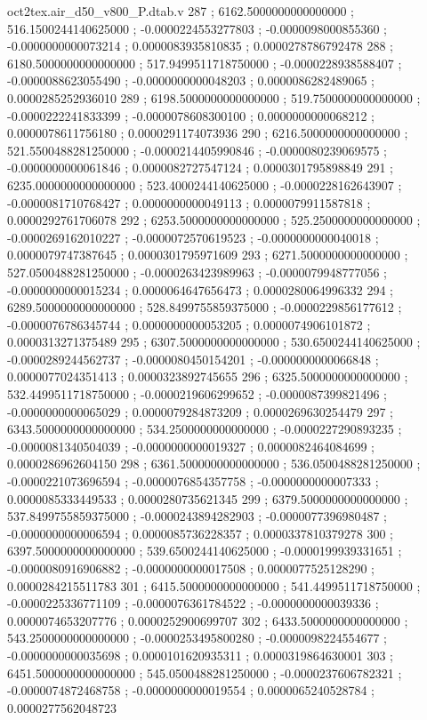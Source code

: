 \begin{filecontents}[overwrite]{oct2tex.air_d50_v800_P.dtab.v}
287 ; 6162.5000000000000000 ; 516.1500244140625000 ; -0.0000224553277803 ; -0.0000098000855360 ; -0.0000000000073214 ; 0.0000083935810835 ; 0.0000278786792478
288 ; 6180.5000000000000000 ; 517.9499511718750000 ; -0.0000228938588407 ; -0.0000088623055490 ; -0.0000000000048203 ; 0.0000086282489065 ; 0.0000285252936010
289 ; 6198.5000000000000000 ; 519.7500000000000000 ; -0.0000222241833399 ; -0.0000078608300100 ; 0.0000000000068212 ; 0.0000078611756180 ; 0.0000291174073936
290 ; 6216.5000000000000000 ; 521.5500488281250000 ; -0.0000214405990846 ; -0.0000080239069575 ; -0.0000000000061846 ; 0.0000082727547124 ; 0.0000301795898849
291 ; 6235.0000000000000000 ; 523.4000244140625000 ; -0.0000228162643907 ; -0.0000081710768427 ; 0.0000000000049113 ; 0.0000079911587818 ; 0.0000292761706078
292 ; 6253.5000000000000000 ; 525.2500000000000000 ; -0.0000269162010227 ; -0.0000072570619523 ; -0.0000000000040018 ; 0.0000079747387645 ; 0.0000301795971609
293 ; 6271.5000000000000000 ; 527.0500488281250000 ; -0.0000263423989963 ; -0.0000079948777056 ; -0.0000000000015234 ; 0.0000064647656473 ; 0.0000280064996332
294 ; 6289.5000000000000000 ; 528.8499755859375000 ; -0.0000229856177612 ; -0.0000076786345744 ; 0.0000000000053205 ; 0.0000074906101872 ; 0.0000313271375489
295 ; 6307.5000000000000000 ; 530.6500244140625000 ; -0.0000289244562737 ; -0.0000080450154201 ; -0.0000000000066848 ; 0.0000077024351413 ; 0.0000323892745655
296 ; 6325.5000000000000000 ; 532.4499511718750000 ; -0.0000219606299652 ; -0.0000087399821496 ; -0.0000000000065029 ; 0.0000079284873209 ; 0.0000269630254479
297 ; 6343.5000000000000000 ; 534.2500000000000000 ; -0.0000227290893235 ; -0.0000081340504039 ; -0.0000000000019327 ; 0.0000082464084699 ; 0.0000286962604150
298 ; 6361.5000000000000000 ; 536.0500488281250000 ; -0.0000221073696594 ; -0.0000076854357758 ; -0.0000000000007333 ; 0.0000085333449533 ; 0.0000280735621345
299 ; 6379.5000000000000000 ; 537.8499755859375000 ; -0.0000243894282903 ; -0.0000077396980487 ; -0.0000000000006594 ; 0.0000085736228357 ; 0.0000337810379278
300 ; 6397.5000000000000000 ; 539.6500244140625000 ; -0.0000199939331651 ; -0.0000080916906882 ; -0.0000000000017508 ; 0.0000077525128290 ; 0.0000284215511783
301 ; 6415.5000000000000000 ; 541.4499511718750000 ; -0.0000225336771109 ; -0.0000076361784522 ; -0.0000000000039336 ; 0.0000074653207776 ; 0.0000252900699707
302 ; 6433.5000000000000000 ; 543.2500000000000000 ; -0.0000253495800280 ; -0.0000098224554677 ; -0.0000000000035698 ; 0.0000101620935311 ; 0.0000319864630001
303 ; 6451.5000000000000000 ; 545.0500488281250000 ; -0.0000237606782321 ; -0.0000074872468758 ; -0.0000000000019554 ; 0.0000065240528784 ; 0.0000277562048723

\end{filecontents}
